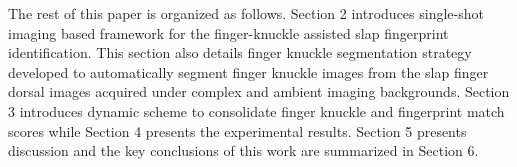 The rest of this paper is organized as follows. Section 2 introduces single-shot imaging based framework for the finger-knuckle assisted slap fingerprint identification. This section also details finger knuckle segmentation strategy developed to automatically segment finger knuckle images from the slap finger dorsal images acquired under complex and ambient imaging backgrounds. Section 3 introduces dynamic scheme to consolidate finger knuckle and fingerprint match scores while Section 4 presents the experimental results. Section 5 presents discussion and the key conclusions of this work are summarized in Section 6.